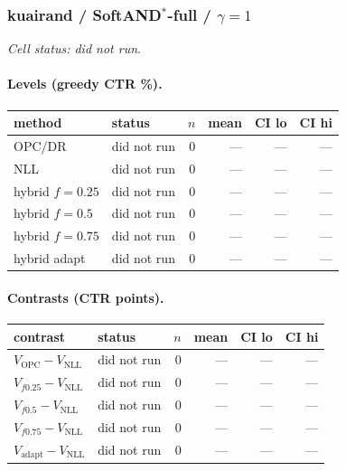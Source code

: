 \documentclass[10pt,a4paper]{article}
\begin{document}
\subsubsection{kuairand / SoftAND$^*$-full / $\gamma=1$}
\emph{Cell status: did not run}.
\paragraph{Levels (greedy CTR \%).}
{\centering\small\begin{tabular}{llrrrr}
\toprule method & status & $n$ & mean & CI lo & CI hi \\
\midrule
OPC/DR & did not run & 0 & --- & --- & --- \\
NLL & did not run & 0 & --- & --- & --- \\
hybrid $f{=}0.25$ & did not run & 0 & --- & --- & --- \\
hybrid $f{=}0.5$ & did not run & 0 & --- & --- & --- \\
hybrid $f{=}0.75$ & did not run & 0 & --- & --- & --- \\
hybrid adapt & did not run & 0 & --- & --- & --- \\
\bottomrule\end{tabular}\par}
\paragraph{Contrasts (CTR points).}
{\centering\small\begin{tabular}{llrrrr}
\toprule contrast & status & $n$ & mean & CI lo & CI hi \\
\midrule
$V_{\mathrm{OPC}}-V_{\mathrm{NLL}}$ & did not run & 0 & --- & --- & --- \\
$V_{f0.25}-V_{\mathrm{NLL}}$ & did not run & 0 & --- & --- & --- \\
$V_{f0.5}-V_{\mathrm{NLL}}$ & did not run & 0 & --- & --- & --- \\
$V_{f0.75}-V_{\mathrm{NLL}}$ & did not run & 0 & --- & --- & --- \\
$V_{\mathrm{adapt}}-V_{\mathrm{NLL}}$ & did not run & 0 & --- & --- & --- \\
\bottomrule\end{tabular}\par}
\end{document}
